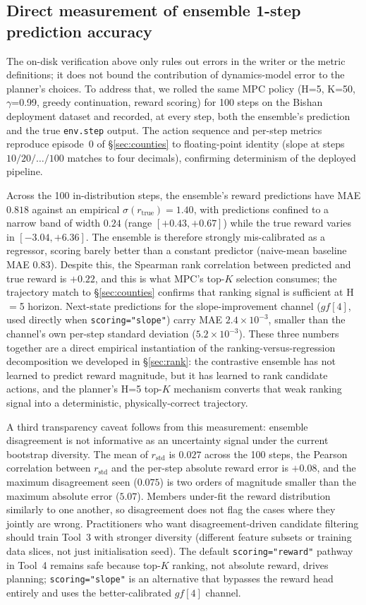 \documentclass[11pt]{article}
\begin{document}
\subsection*{Direct measurement of ensemble 1-step prediction accuracy}\label{sec:methods-mae}

The on-disk verification above only rules out errors in the writer or the metric definitions; it does not bound the contribution of dynamics-model error to the planner's choices. To address that, we rolled the same MPC policy (H=5, K=50, $\gamma$=0.99, greedy continuation, reward scoring) for 100 steps on the Bishan deployment dataset and recorded, at every step, both the ensemble's prediction and the true \texttt{env.step} output. The action sequence and per-step metrics reproduce episode~0 of \S\ref{sec:counties} to floating-point identity (slope at steps $10/20/\dots/100$ matches to four decimals), confirming determinism of the deployed pipeline.

Across the 100 in-distribution steps, the ensemble's reward predictions have MAE $0.818$ against an empirical $\sigma(r_{\text{true}})=1.40$, with predictions confined to a narrow band of width $0.24$ (range $[+0.43, +0.67]$) while the true reward varies in $[-3.04, +6.36]$. The ensemble is therefore strongly mis-calibrated as a regressor, scoring barely better than a constant predictor (naive-mean baseline MAE $0.83$). Despite this, the Spearman rank correlation between predicted and true reward is $+0.22$, and this is what MPC's top-$K$ selection consumes; the trajectory match to \S\ref{sec:counties} confirms that ranking signal is sufficient at H$=$5 horizon. Next-state predictions for the slope-improvement channel ($gf[4]$, used directly when \texttt{scoring="slope"}) carry MAE $2.4\times 10^{-3}$, smaller than the channel's own per-step standard deviation ($5.2\times 10^{-3}$). These three numbers together are a direct empirical instantiation of the ranking-versus-regression decomposition we developed in \S\ref{sec:rank}: the contrastive ensemble has not learned to predict reward magnitude, but it has learned to rank candidate actions, and the planner's H=5 top-$K$ mechanism converts that weak ranking signal into a deterministic, physically-correct trajectory.

A third transparency caveat follows from this measurement: ensemble disagreement is not informative as an uncertainty signal under the current bootstrap diversity. The mean of $r_{\text{std}}$ is $0.027$ across the 100 steps, the Pearson correlation between $r_{\text{std}}$ and the per-step absolute reward error is $+0.08$, and the maximum disagreement seen ($0.075$) is two orders of magnitude smaller than the maximum absolute error ($5.07$). Members under-fit the reward distribution similarly to one another, so disagreement does not flag the cases where they jointly are wrong. Practitioners who want disagreement-driven candidate filtering should train Tool~3 with stronger diversity (different feature subsets or training data slices, not just initialisation seed). The default \texttt{scoring="reward"} pathway in Tool~4 remains safe because top-$K$ ranking, not absolute reward, drives planning; \texttt{scoring="slope"} is an alternative that bypasses the reward head entirely and uses the better-calibrated $gf[4]$ channel.
\end{document}
